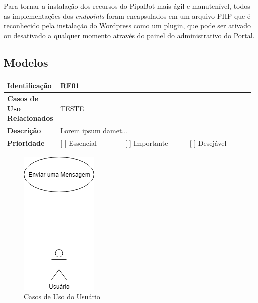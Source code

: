   Para tornar a instalação dos recursos do PipaBot mais ágil e manutenível, todos as implementações dos \textit{endpoints} foram encapsulados em um arquivo PHP que é reconhecido pela instalação do Wordpress como um plugin, que pode ser ativado ou desativado a qualquer momento através do painel do administrativo do Portal.
  
  \subsection{Modelos}
  	\begin{center}
  		\begin{tabular}{ | m{0.2\linewidth} | m{0.26\linewidth} | m{0.26\linewidth} | m{0.26\linewidth} | } 
  			\hline
  			\textbf{Identificação} & \multicolumn{3}{l|}{RF01}\\ 
  			\hline
  			\textbf{Casos de Uso Relacionados} & \multicolumn{3}{l|}{TESTE}\\ 
  			\hline
  			\textbf{Descrição} & \multicolumn{3}{l|}{Lorem ipsum damet...}\\ 
  			\hline
  			\textbf{Prioridade} & [ ] Essencial & [ ] Importante & [ ] Desejável \\
  			\hline
  		\end{tabular}
  	\end{center}
  
	
	
	\begin{figure}[h!]
	 	\begin{center}
	 		\includegraphics[scale=0.6]{images/UC_Usuario.png}
	 		\caption{Casos de Uso do Usuário}
	 		\label{fig:ucusuario}
	 	\end{center}
	\end{figure}

